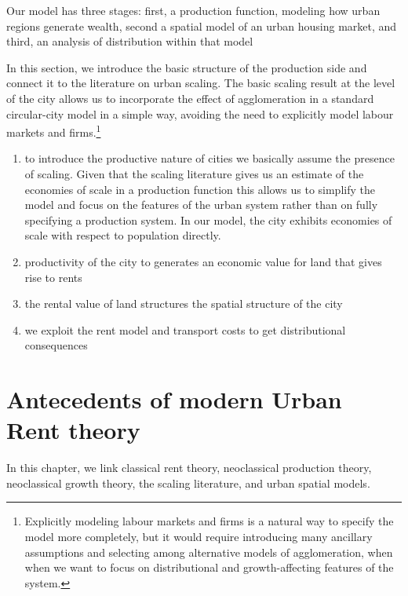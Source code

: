 Our model has three stages: first, a production function, modeling how urban regions generate wealth,  second a spatial model of an urban housing market, and third, an analysis of distribution within that model 

In this section, we introduce the basic structure of the production side and connect it to the literature on urban scaling. The basic scaling result at the level of the city allows us to incorporate the effect of agglomeration in a standard  circular-city model in a simple way, avoiding the need to explicitly model labour markets and firms.\footnote{Explicitly modeling labour markets and firms is a natural way to specify the model more completely, but it would require introducing many ancillary assumptions and selecting among alternative models of agglomeration, when when we want to focus on distributional and growth-affecting features of the system.}

\begin{enumerate}
    \item to introduce  the productive nature of cities we basically assume the presence of scaling. Given  that the scaling literature gives us an estimate of the economies of scale in a production function this allows us to simplify the model and focus on the features of the urban system rather than on fully specifying a production system. In our model, the city  exhibits economies of scale with respect to population directly. 

     \item  productivity of the city to generates an economic value for land that gives rise to rents

    \item  the rental value of land structures the spatial structure of the city

    \item we exploit the rent model and transport costs to get  distributional consequences
\end{enumerate}






\color{red}
\chapter{Antecedents of modern Urban Rent theory}
In this chapter, we link classical rent theory, neoclassical production theory, neoclassical growth theory, the scaling literature,  and urban spatial models. 

